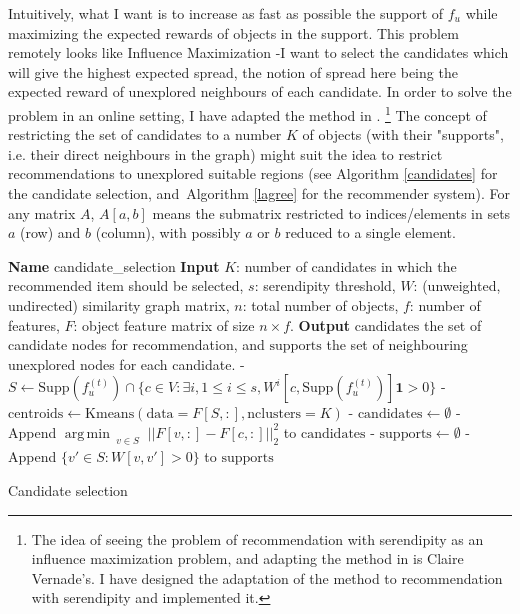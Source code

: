 \documentclass{article}
\DeclareMathOperator*{\argmin}{arg\,min\,}
\begin{document}
Intuitively, what I want is to increase as fast as possible the support of $f_{u}$ while maximizing the expected rewards of objects in the support. This problem remotely looks like Influence Maximization -I want to select the candidates which will give the highest expected spread, the notion of spread here being the expected reward of unexplored neighbours of each candidate. In order to solve the problem in an online setting, I have adapted the method in \cite{lagree2017effective}. \footnote{The idea of seeing the problem of recommendation with serendipity as an influence maximization problem, and adapting the method in \cite{lagree2017effective} is Claire Vernade's. I have designed the adaptation of the method to recommendation with serendipity and implemented it.} The concept of restricting the set of candidates to a number $K$ of objects (with their "supports", i.e. their direct neighbours in the graph) might suit the idea to restrict recommendations to unexplored suitable regions (see Algorithm \ref{candidates} for the candidate selection, and Algorithm \ref{lagree} for the recommender system). For any matrix $A$, $A[a, b]$ means the submatrix restricted to indices/elements in sets $a$ (row) and $b$ (column), with possibly $a$ or $b$ reduced to a single element.

\begin{algorithm}
\begin{algorithmic}
\STATE \textbf{Name} candidate\_selection
\STATE \textbf{Input} $K$: number of candidates in which the recommended item should be selected, $s$: serendipity threshold, $W$: (unweighted, undirected) similarity graph matrix, $n$: total number of objects, $f$: number of features, $F$: object feature matrix of size $n \times f$.
\STATE \textbf{Output} $\text{candidates}$ the set of candidate nodes for recommendation, and $\text{supports}$ the set of neighbouring unexplored nodes for each candidate.
\STATE - $S \leftarrow \text{Supp}(f^{(t)}_{u}) \cap \{c \in V : \exists i, 1 \leq i \leq s, W^{i}[c, \text{Supp}(f^{(t)}_{u})]\textbf{1} > 0 \}$
\STATE - $\text{centroids} \leftarrow \text{Kmeans}(\text{data}=F[S,:],\text{nclusters}=K)$
\STATE - $\text{candidates} \leftarrow \emptyset$
\STATE - Append $\argmin_{\substack{v \in S}} ||F[v, :]-F[c, :]||^{2}_2$ to $\text{candidates}$
\ENDFOR
\STATE - $\text{supports} \leftarrow \emptyset$
\STATE - Append $\{v' \in S : W[v,v'] > 0\}$ to $\text{supports}$
\ENDFOR
\end{algorithmic}
\caption{Candidate selection}
\label{candidates}
\end{algorithm}
\end{document}
